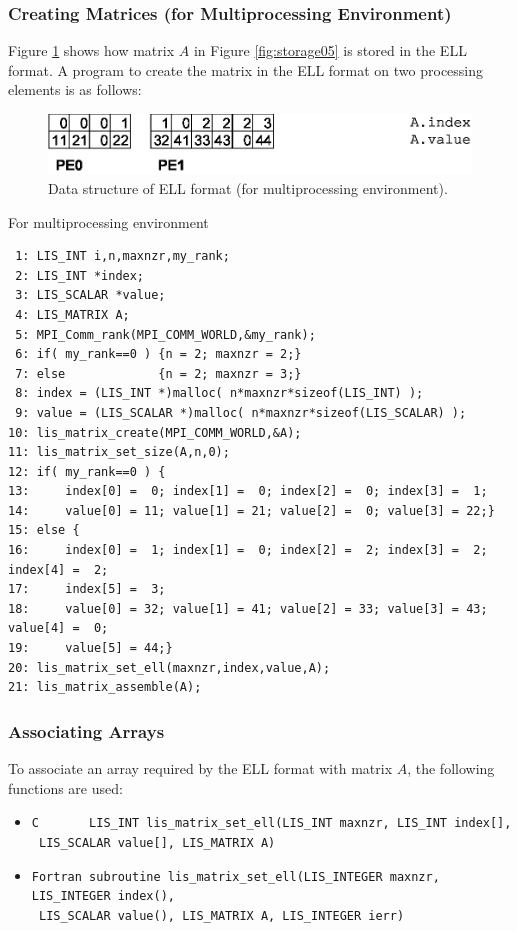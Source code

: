 \documentclass[a4paper]{article}
\begin{document}
\newpage
\subsubsection{Creating Matrices (for Multiprocessing Environment)}
Figure \ref{fig:storage05_mpi} shows how matrix $A$ in Figure \ref{fig:storage05} is stored in the ELL format. A program to create the matrix in the ELL format on two processing elements is as follows:
\begin{figure}[h]
{\centering 
\includegraphics{storage05_mpi.eps} 
\caption{Data structure of ELL format (for multiprocessing environment).}\label{fig:storage05_mpi}}
\end{figure}
\begin{itemsquarebox}[l]{For multiprocessing environment}
\small
\begin{verbatim}
 1: LIS_INT i,n,maxnzr,my_rank;
 2: LIS_INT *index;
 3: LIS_SCALAR *value;
 4: LIS_MATRIX A;
 5: MPI_Comm_rank(MPI_COMM_WORLD,&my_rank);
 6: if( my_rank==0 ) {n = 2; maxnzr = 2;}
 7: else             {n = 2; maxnzr = 3;}
 8: index = (LIS_INT *)malloc( n*maxnzr*sizeof(LIS_INT) );
 9: value = (LIS_SCALAR *)malloc( n*maxnzr*sizeof(LIS_SCALAR) );
10: lis_matrix_create(MPI_COMM_WORLD,&A);
11: lis_matrix_set_size(A,n,0);
12: if( my_rank==0 ) {
13:     index[0] =  0; index[1] =  0; index[2] =  0; index[3] =  1;
14:     value[0] = 11; value[1] = 21; value[2] =  0; value[3] = 22;}
15: else {
16:     index[0] =  1; index[1] =  0; index[2] =  2; index[3] =  2; index[4] =  2;
17:     index[5] =  3;
18:     value[0] = 32; value[1] = 41; value[2] = 33; value[3] = 43; value[4] =  0;
19:     value[5] = 44;}
20: lis_matrix_set_ell(maxnzr,index,value,A);
21: lis_matrix_assemble(A);
\end{verbatim}
\end{itemsquarebox}

\subsubsection{Associating Arrays}
To associate an array required by the ELL format with matrix $A$, the following functions are used:
\begin{itemize}
\item \verb|C       LIS_INT lis_matrix_set_ell(LIS_INT maxnzr, LIS_INT index[],|\\
      \verb| LIS_SCALAR value[], LIS_MATRIX A)|
\item \verb|Fortran subroutine lis_matrix_set_ell(LIS_INTEGER maxnzr, LIS_INTEGER index(),|\\
      \verb| LIS_SCALAR value(), LIS_MATRIX A, LIS_INTEGER ierr)|
\end{itemize}
\end{document}
